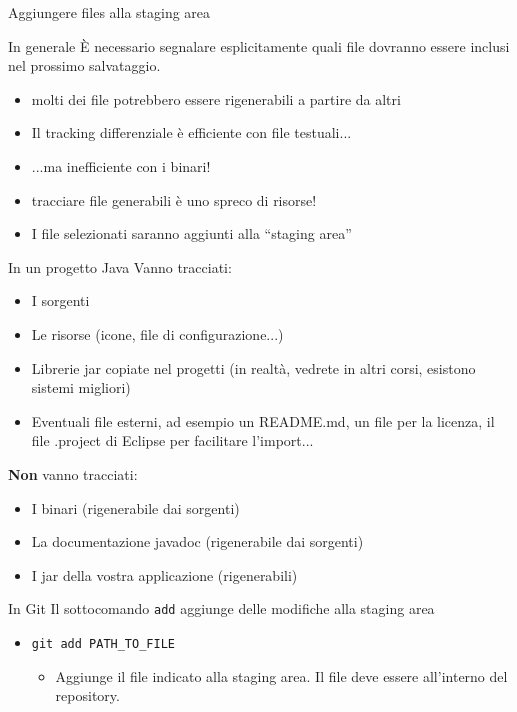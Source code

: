 \documentclass[presentation]{beamer}
\begin{document}
\begin{frame}{Aggiungere files alla staging area}
	\begin{block}{In generale}	
		È necessario segnalare esplicitamente quali file dovranno essere inclusi nel prossimo salvataggio.
		\begin{itemize}
			\item molti dei file potrebbero essere rigenerabili a partire da altri
			\item Il tracking differenziale è efficiente con file testuali...
			\item ...ma inefficiente con i binari!
			\item tracciare file generabili è uno spreco di risorse!
			\item I file selezionati saranno aggiunti alla ``staging area''
		\end{itemize}
	\end{block}
	\begin{block}{In un progetto Java}	
		Vanno tracciati:
		\begin{itemize}
			\item I sorgenti
			\item Le risorse (icone, file di configurazione...)
			\item Librerie jar copiate nel progetti (in realtà, vedrete in altri corsi, esistono sistemi migliori)
			\item Eventuali file esterni, ad esempio un README.md, un file per la licenza, il file .project di Eclipse per facilitare l'import...
		\end{itemize}
		\textbf{Non} vanno tracciati:
		\begin{itemize}
			\item I binari (rigenerabile dai sorgenti)
			\item La documentazione javadoc (rigenerabile dai sorgenti)
			\item I jar della vostra applicazione (rigenerabili)
		\end{itemize}
	\end{block}
	\begin{block}{In Git}
		Il sottocomando \texttt{add} aggiunge delle modifiche alla staging area
		\begin{itemize}
			\item \texttt{git add PATH\_TO\_FILE}
			\begin{itemize}
				\item Aggiunge il file indicato alla staging area. Il file deve essere all'interno del repository.

\end{itemize}
\end{itemize}
\end{block}
\end{frame}
\end{document}
